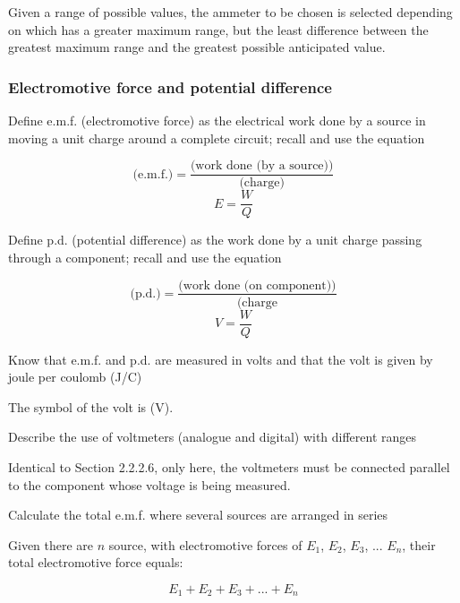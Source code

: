 Given a range of possible values,
the ammeter to be chosen is selected depending on which has a greater maximum range, but the
least difference between the greatest maximum range and the greatest possible anticipated value.

\subsubsection{Electromotive force and potential difference}

\begin{subpoint}
Define e.m.f. (electromotive force) as the electrical work done by a source in moving a unit charge around a 
complete circuit; recall and use the equation

$$ \textrm{(e.m.f.)} = \frac{\textrm{(work done (by a source))}}{\textrm{(charge)}} $$
$$ E = \frac{W}{Q} $$
\end{subpoint}

\begin{subpoint}
Define p.d. (potential difference) as the work done by a unit charge passing through a component; recall 
and use the equation

$$ \textrm{(p.d.)} = \frac{\textrm{(work done (on component))}}{\textrm{(charge}} $$
$$ V = \frac{W}{Q} $$
\end{subpoint}

\begin{subpoint}
Know that e.m.f. and p.d. are measured in volts and that the volt is given by joule per coulomb (J/C)
\end{subpoint}

The symbol of the volt is (V).

\begin{subpoint}
Describe the use of voltmeters (analogue and digital) with different ranges
\end{subpoint}

Identical to Section 2.2.2.6, only here, the voltmeters must be connected parallel to the 
component whose voltage is being measured.

\begin{subpoint}
Calculate the total e.m.f. where several sources are arranged in series
\end{subpoint}

Given there are $n$ source, with electromotive forces of $E_1$, $E_2$, $E_3$, ... $E_n$,
their total electromotive force equals:

$$ E_1 + E_2 + E_3 + ... + E_n $$

